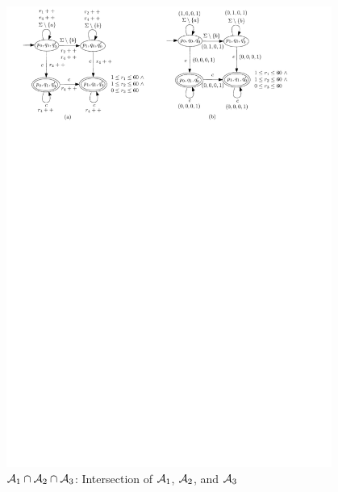 \begin{figure}[ht]
  \centering
  \includegraphics[width = 0.95\textwidth]{sections/overview-cefa-product.pdf}
  \caption{$\mathcal{A}_1 \cap \mathcal{A}_2 \cap \mathcal{A}_3$: Intersection of $\mathcal{A}_1$, $\mathcal{A}_2$, and $\mathcal{A}_3$}
  \label{fig:overview:product}
\end{figure}

